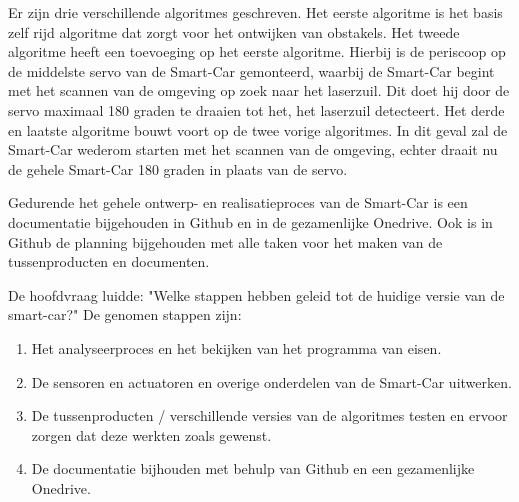 \begin{comment}
Om de infrarood sensoren\cite{IR-datasheet} te testen, moeten ze worden aangesloten op het \gls{motorshield} en moet de digitale pin op de Arduino Mega 2560\cite{ArduinoMEGA} worden gedefinieerd als de invoerpin. Ultrasone sensoren worden getest door de VCC- en GND-pinnen aan te sluiten op het \gls{motorshield}, en de trigger- en echo-pinnen op een digitale pin van de Arduino Mega 2560\cite{ArduinoMEGA}. De echo-pin wordt gebruikt om de afstand te bepalen door de tijd te meten die nodig is voor het ultrasone geluid om terug te kaatsen en hiermee vervolgens de berekening "afstand = de gemeette tijd × de geluidssnelheid" uit te voeren. De motordriver\cite{h-brug} wordt aangestuurd door de shiftregisters\cite{shiftregister}, welke een 8-bits signaal decodeert. Hiervoor is een Excel-script geschreven dat testen heel makkelijk maakte.
\end{comment}

Er zijn drie verschillende algoritmes geschreven. Het eerste algoritme is het basis zelf rijd algoritme dat zorgt voor het ontwijken van obstakels. Het tweede algoritme heeft een toevoeging op het eerste algoritme. Hierbij is de periscoop op de middelste servo van de \gls{Smart-Car} gemonteerd, waarbij de \gls{Smart-Car} begint met het scannen van de omgeving op zoek naar het laserzuil. Dit doet hij door de servo maximaal 180 graden te draaien tot het, het laserzuil detecteert. Het derde en laatste algoritme bouwt voort op de twee vorige algoritmes. In dit geval zal de \gls{Smart-Car} wederom starten met het scannen van de omgeving, echter draait nu de gehele \gls{Smart-Car} 180 graden in plaats van de servo.

Gedurende het gehele ontwerp- en realisatieproces van de \gls{Smart-Car} is een documentatie bijgehouden in Github en in de gezamenlijke Onedrive. Ook is in Github de planning bijgehouden met alle taken voor het maken van de tussenproducten en documenten. 

De hoofdvraag luidde: "Welke stappen hebben geleid tot de huidige versie van de smart-car?" De genomen stappen zijn: 
\begin{enumerate}
    \item Het analyseerproces en het bekijken van het programma van eisen.
    \item De sensoren en actuatoren en overige onderdelen van de \gls{Smart-Car} uitwerken.
    \item De tussenproducten / verschillende versies van de algoritmes testen en ervoor zorgen dat deze werkten zoals gewenst.
    \item De documentatie bijhouden met behulp van Github en een gezamenlijke Onedrive. 
\end{enumerate}

